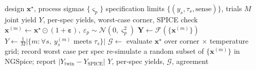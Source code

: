 \begin{algorithm}[!t]
\caption{Digital-twin robustness and yield estimation}
\label{alg:digital_twin_robustness_and_yield_estimation}
\begin{algorithmic}[1]
\Require design $\mathbf{x}^\star$, process sigmas $\{\varsigma_p\}$
\Require specification limits $\{(y_s, \tau_s, \text{sense})\}$, trials $M$
\Ensure joint yield $Y$, per-spec yields, worst-case corner, SPICE check
        \State $\mathbf{x}^{(m)} \leftarrow \mathbf{x}^\star \odot (1 + \boldsymbol{\varepsilon}),\ \varepsilon_p\sim\mathcal{N}(0,\varsigma_p^2)$
    \EndFor
    \State $\mathbf{Y} \leftarrow \mathcal{F}(\{\mathbf{x}^{(m)}\})$
    \State $Y \leftarrow \frac{1}{M}\big|\{m : \forall s,\ y_s^{(m)} \text{ meets } \tau_s\}\big|$
    \State $\mathcal{G} \leftarrow$ evaluate $\mathbf{x}^\star$ over corner $\times$ temperature grid; record worst case per spec
    \State re-simulate a random subset of $\{\mathbf{x}^{(m)}\}$ in NGSpice; report $|Y_{\text{twin}} - Y_{\text{SPICE}}|$
    \Return $Y$, per-spec yields, $\mathcal{G}$, agreement
\end{algorithmic}
\end{algorithm}
